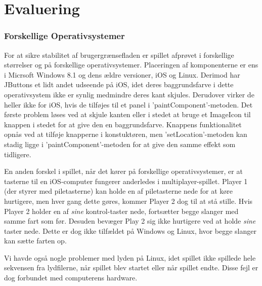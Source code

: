 \section{Evaluering}

\subsubsection{Forskellige Operativsystemer}
For at sikre stabilitet af brugergrænsefladen er spillet afprøvet i forskellige størrelser og på forskellige operativsystemer. Placeringen af komponenterne er ens i Micrsoft Windows 8.1 og dens ældre versioner, iOS og Linux. Derimod har JButtons et lidt andet udseende på iOS, idet deres baggrundsfarve i dette operativsystem ikke er synlig medmindre deres kant skjules. Derudover virker de heller ikke for iOS, hvis de tilføjes til et panel i 'paintComponent'-metoden. Det første problem løses ved at skjule kanten eller i stedet at bruge et ImageIcon til knappen i stedet for at give den en baggrundsfarve. Knappens funktionalitet opnås ved at tilføje knapperne i konstuktøren, men 'setLocation'-metoden kan stadig ligge i 'paintComponent'-metoden for at give den samme effekt som tidligere.
\newline

En anden forskel i spillet, når det kører på forskellige operativsystemer, er at tasterne til en iOS-computer fungerer anderledes i multiplayer-spillet. Player 1 (der styrer med piletasterne) kan holde en af piletasterne nede for at køre hurtigere, men hver gang dette gøres, kommer Player 2 dog til at stå stille. Hvis Player 2 holder en af \textit{sine} kontrol-taster nede, fortsætter begge slanger med samme fart som før. Desuden bevæger Play 2 sig ikke hurtigere ved at holde \textit{sine} taster nede. Dette er dog ikke tilfældet på Windows og Linux, hvor begge slanger kan sætte farten op.
\newline

Vi havde også nogle problemer med lyden på Linux, idet spillet ikke spillede hele sekvensen fra lydfilerne, når spillet blev startet eller når spillet endte.
Disse fejl er dog forbundet med computerens hardware.


